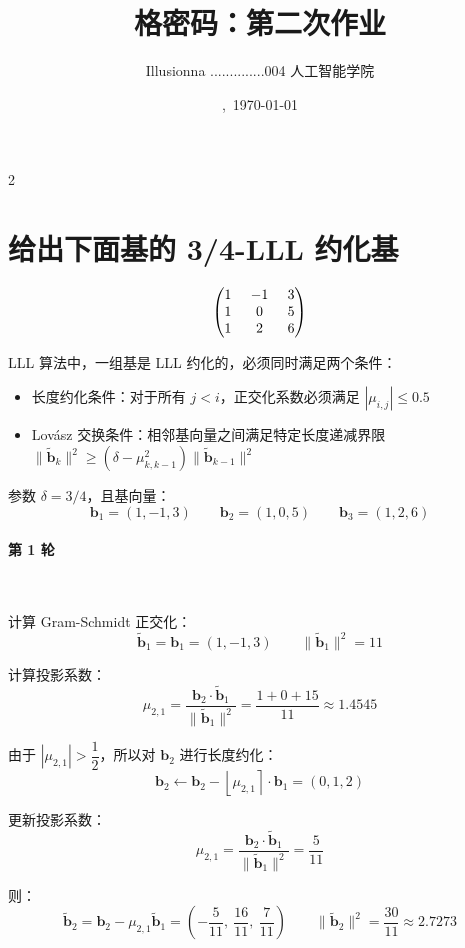 \documentclass{article}
\title{格密码：第二次作业}
\author{Illusionna \quad 2025..............004 \quad 人工智能学院}
\date{\currenttime,\ \today}
\begin{document}
\maketitle
\thispagestyle{empty}
\begin{spacing}{2}
    \tableofcontents
\end{spacing}
\thispagestyle{empty}
\clearpage
\setcounter{page}{1}



\section{给出下面基的 3/4-LLL 约化基}
\[ \setlength{\arraycolsep}{7pt}\begin{pmatrix}
    1 & -1 & 3 \\
    1 & 0 & 5 \\
    1 & 2 & 6 \\
\end{pmatrix} \]

LLL 算法中，一组基是 LLL 约化的，必须同时满足两个条件：

\begin{itemize}
    \item 长度约化条件：对于所有 $j<i$，正交化系数必须满足 $|\mu_{i,j}|\leqslant0.5$
    \item Lov\'asz 交换条件：相邻基向量之间满足特定长度递减界限 $\|\tilde{\bm{b}}_{k}\|^2\geqslant(\delta-\mu_{k,k-1}^2)\|\tilde{\bm{b}}_{k-1}\|^2$
\end{itemize}

参数 $\delta=3/4$，且基向量：
\[ \bm{b}_1=(1,-1,3)\qquad\bm{b}_2=(1,0,5)\qquad\bm{b}_3=(1,2,6) \]

\paragraph*{第 1 轮}~{}

计算 Gram-Schmidt 正交化：
\[ \tilde{\bm{b}}_1=\bm{b}_1=(1,-1,3)\qquad \|\tilde{\bm{b}}_1\|^2=11 \]

计算投影系数：
\[ \mu_{2,1}=\dfrac{\bm{b}_2\cdot\tilde{\bm{b}}_1}{\|\tilde{\bm{b}}_1\|^2}=\dfrac{1+0+15}{11}\approx1.4545 \]

由于 $|\mu_{2,1}|>\dfrac{1}{2}$，所以对 $\bm{b}_2$ 进行长度约化：
\[ \bm{b}_2\leftarrow\bm{b}_2-\left\lfloor\mu_{2,1}\right\rceil\cdot\bm{b}_1=(0,1,2) \]

更新投影系数：
\[ \mu_{2,1}=\dfrac{\bm{b}_2\cdot\tilde{\bm{b}}_1}{\|\tilde{\bm{b}}_1\|^2}=\dfrac{5}{11} \]

则：
\[ \tilde{\bm{b}}_2=\bm{b}_2-\mu_{2,1}\tilde{\bm{b}}_1=\left(-\dfrac{5}{11},\ \dfrac{16}{11},\ \dfrac{7}{11}\right)\qquad\|\tilde{\bm{b}}_2\|^2=\dfrac{30}{11}\approx2.7273 \]
\end{document}
